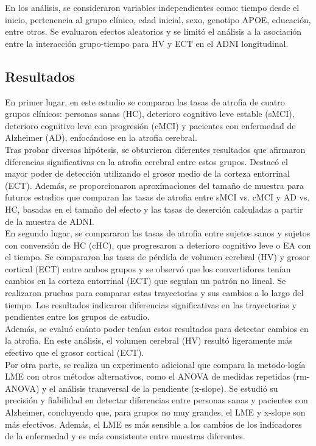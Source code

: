 \documentclass[12pt]{article}
\begin{document}
En los análisis, se consideraron variables independientes como: tiempo desde el inicio, pertenencia al grupo clínico, edad inicial, sexo, genotipo APOE, educación, entre otros. Se evaluaron efectos aleatorios y se limitó el análisis a la asociación entre la interacción grupo-tiempo para HV y ECT en el ADNI longitudinal.


\subsection{Resultados}
En primer lugar, en este estudio se comparan las tasas de atrofia de cuatro grupos clínicos: personas sanas (HC), deterioro cognitivo leve estable (sMCI), deterioro cognitivo leve con progresión (cMCI) y pacientes con enfermedad de Alzheimer (AD), enfocándose en la atrofia cerebral.\\

Tras probar diversas hipótesis, se obtuvieron diferentes resultados que afirmaron diferencias significativas en la atrofia cerebral entre estos grupos. Destacó el mayor poder de detección utilizando el grosor medio de la corteza entorrinal (ECT). Además, se proporcionaron aproximaciones del tamaño de muestra para futuros estudios que comparan las tasas de atrofia entre sMCI vs. cMCI y AD vs. HC, basadas en el tamaño del efecto y las tasas de deserción calculadas a partir de la muestra de ADNI.\\

En segundo lugar, se compararon las tasas de atrofia entre sujetos sanos y sujetos con conversión de HC (cHC), que progresaron a deterioro cognitivo leve o EA con el tiempo. Se compararon las tasas de pérdida de volumen cerebral (HV) y grosor cortical (ECT) entre ambos grupos y se observó que los convertidores tenían cambios en la corteza entorrinal (ECT) que seguían un patrón no lineal. Se realizaron pruebas para comparar estas trayectorias y sus cambios a lo largo del tiempo. Los resultados indicaron diferencias significativas en las trayectorias y pendientes entre los grupos de estudio.\\

 Además, se evaluó cuánto poder tenían estos resultados para detectar cambios en la atrofia. En este análisis, el volumen cerebral (HV) resultó ligeramente más efectivo que el grosor cortical (ECT).\\
 
 Por otra parte, se realiza un experimento adicional que compara la metodo-logía LME con otros métodos alternativos, como el ANOVA de medidas repetidas (rm-ANOVA) y el análisis transversal de la pendiente (x-slope). Se estudió su precisión y fiabilidad en detectar diferencias entre personas sanas y pacientes con Alzheimer, concluyendo que, para grupos no muy grandes, el LME y x-slope son más efectivos. Además, el LME es más sensible a los cambios de los indicadores de la enfermedad y es más consistente entre muestras diferentes.\\
 
\end{document}
